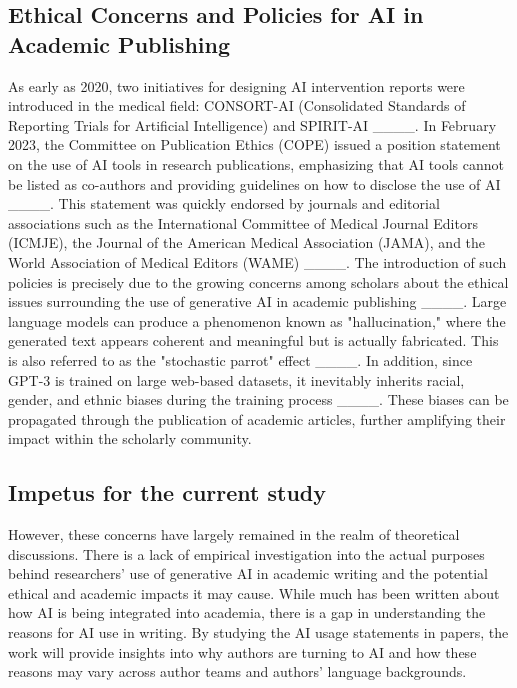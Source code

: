 \subsection{Ethical Concerns and Policies for AI in Academic Publishing}
As early as 2020, two initiatives for designing AI intervention reports were introduced in the medical field: CONSORT-AI (Consolidated Standards of Reporting Trials for Artificial Intelligence) and SPIRIT-AI ____. In February 2023, the Committee on Publication Ethics (COPE) issued a position statement on the use of AI tools in research publications, emphasizing that AI tools cannot be listed as co-authors and providing guidelines on how to disclose the use of AI ____. This statement was quickly endorsed by journals and editorial associations such as the International Committee of Medical Journal Editors (ICMJE), the Journal of the American Medical Association (JAMA), and the World Association of Medical Editors (WAME) ____.  The introduction of such policies is precisely due to the growing concerns among scholars about the ethical issues surrounding the use of generative AI in academic publishing ____.  Large language models can produce a phenomenon known as "hallucination," where the generated text appears coherent and meaningful but is actually fabricated. This is also referred to as the "stochastic parrot" effect ____. In addition, since GPT-3 is trained on large web-based datasets, it inevitably inherits racial, gender, and ethnic biases during the training process ____. These biases can be propagated through the publication of academic articles, further amplifying their impact within the scholarly community. 
\subsection{Impetus for the current study}
However, these concerns have largely remained in the realm of theoretical discussions. There is a lack of empirical investigation into the actual purposes behind researchers' use of generative AI in academic writing and the potential ethical and academic impacts it may cause. While much has been written about how AI is being integrated into academia, there is a gap in understanding the reasons for AI use in writing.
By studying the AI usage statements in papers, the work will provide insights into why authors are turning to AI and how these reasons may vary across  author teams and authors' language backgrounds.